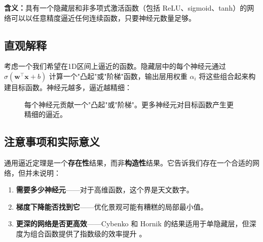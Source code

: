 \textbf{含义：}具有一个隐藏层和非多项式激活函数（包括 ReLU、sigmoid、tanh）的网络可以以任意精度逼近任何连续函数，只要神经元数量足够。

\subsection{直观解释}

考虑一个我们希望在1D区间上逼近的函数。隐藏层中的每个神经元通过 $\sigma(\mathbf{w}^\top \mathbf{x} + b)$ 计算一个"凸起"或"阶梯"函数，输出层用权重 $\alpha_i$ 将这些组合起来构建目标函数。神经元越多，逼近越精细：

\begin{figure}[htbp]
    \centering
    \caption[通用逼近的直观理解]{每个神经元贡献一个"凸起"或"阶梯"。更多神经元对目标函数产生更精细的逼近。}
    \label{fig:uat_intuition}
\end{figure}

\subsection{注意事项和实际意义}

通用逼近定理是一个\textbf{存在性}结果，而非\textbf{构造性}结果。它告诉我们存在一个合适的网络，但并未说明：
\begin{enumerate}
    \item \textbf{需要多少神经元}——对于高维函数，这个界是天文数字。
    \item \textbf{梯度下降能否找到它}——优化景观可能有糟糕的局部最小值。
    \item \textbf{更深的网络是否更高效}——Cybenko 和 Hornik 的结果适用于单隐藏层，但深度为组合函数提供了指数级的效率提升 \cite{montufar2014number}。
\end{enumerate}

